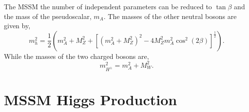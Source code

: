 The MSSM the number of independent parameters can be reduced to 
$\tan{\beta}$ and the mass of the pseudoscalar, $m_{A}$. The masses of the other
neutral bosons are given by,
\begin{equation}
m_{h}^{2}=\frac{1}{2}\left(m_{A}^{2}+M_{Z}^{2}+\left[(m_{A}^{2}+
M_{Z}^{2})^{2}-4M_{Z}^{2}m_{A}^{2}\cos^{2}{(2\beta)}\right]^{\frac{1}{2}}\right).
\end{equation}
While the masses of the two charged bosons are,
\begin{equation}
m_{H^{\pm}}^{2}=m_{A}^{2}+M_{W}^{2}.
\end{equation}

\section{MSSM Higgs Production}